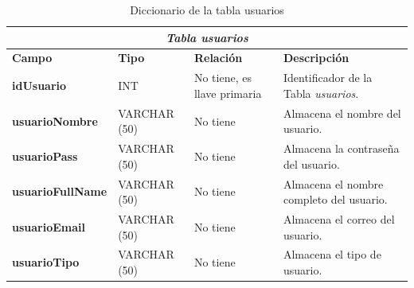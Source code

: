 \begin{table}[H]
\begin{center}
\begin{tabular}{||p{4cm}|p{}|p{}|p{5cm}||}
\hline
\multicolumn{4}{||c||}{\textit{\textbf{Tabla usuarios}}}\\
\hline 
\cellcolor{lightgray}\textbf{Campo} & \cellcolor{lightgray}\textbf{Tipo} & \cellcolor{lightgray}\textbf{Relación} & \cellcolor{lightgray}\textbf{Descripción} \\ \hline 
\textbf{idUsuario} & {INT} & {No tiene, es llave primaria} & {Identificador de la Tabla \textit{usuarios}.} \\ \hline
\textbf{usuarioNombre} & {VARCHAR (50)} & {No tiene} & {Almacena el nombre del usuario.} \\ \hline
\textbf{usuarioPass} & {VARCHAR (50)} & {No tiene} & {Almacena la contraseña del usuario.} \\ \hline
\textbf{usuarioFullName} & {VARCHAR (50)} & {No tiene} & {Almacena el nombre completo del usuario.} \\ \hline
\textbf{usuarioEmail} & {VARCHAR (50)} & {No tiene} & {Almacena el correo del usuario.} \\ \hline
\textbf{usuarioTipo} & {VARCHAR (50)} & {No tiene} & {Almacena el tipo de usuario.} \\ \hline
\end{tabular}
\caption{Diccionario de la tabla usuarios}
\label{Tabla:usuarios}
\end{center}
\end{table}

